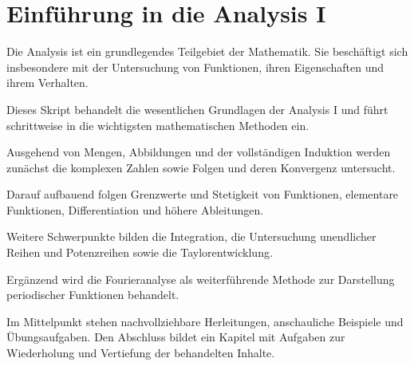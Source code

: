 \section{Einführung in die Analysis I}

Die Analysis ist ein grundlegendes Teilgebiet
der Mathematik. Sie beschäftigt sich insbesondere
mit der Untersuchung von Funktionen, ihren
Eigenschaften und ihrem Verhalten.

Dieses Skript behandelt die wesentlichen
Grundlagen der Analysis I und führt schrittweise
in die wichtigsten mathematischen Methoden ein.

Ausgehend von Mengen, Abbildungen und der
vollständigen Induktion werden zunächst die
komplexen Zahlen sowie Folgen und deren
Konvergenz untersucht.

Darauf aufbauend folgen Grenzwerte und
Stetigkeit von Funktionen, elementare Funktionen,
Differentiation und höhere Ableitungen.

Weitere Schwerpunkte bilden die Integration,
die Untersuchung unendlicher Reihen und
Potenzreihen sowie die Taylorentwicklung.

Ergänzend wird die Fourieranalyse als
weiterführende Methode zur Darstellung
periodischer Funktionen behandelt.

Im Mittelpunkt stehen nachvollziehbare
Herleitungen, anschauliche Beispiele und
Übungsaufgaben. Den Abschluss bildet ein
Kapitel mit Aufgaben zur Wiederholung
und Vertiefung der behandelten Inhalte.